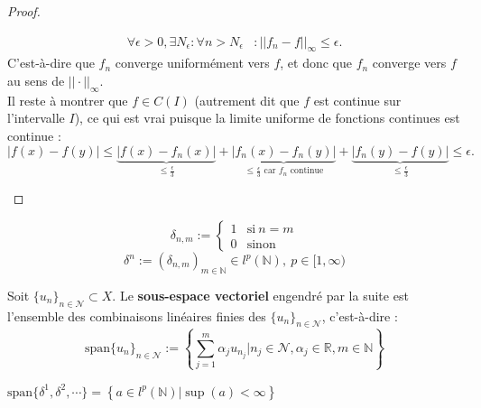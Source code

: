 \begin{proof}
\begin{enumerate}[label=(\roman*)]
\begin{align*}
            \forall\epsilon>0,\exists N_\epsilon:\forall n>N_\epsilon & : ||f_n-f||_\infty\leq\epsilon.
        \end{align*}
        C'est-à-dire que $f_n$ converge uniformément vers $f$, et donc que $f_n$ converge vers $f$ au sens de $||\cdot||_\infty$. \\
        Il reste à montrer que $f\in C(I)$ (autrement dit que $f$ est continue sur l'intervalle $I$), ce qui est vrai puisque la limite uniforme de fonctions continues est continue :
        \begin{equation*}
            |f(x)-f(y)| \leq \underbrace{|f(x)-f_n(x)|}_{\leq \frac{\epsilon}{3}} + \underbrace{|f_n(x)-f_n(y)|}_{\leq \frac{\epsilon}{3} \text{ car $f_n$ continue}} + \underbrace{|f_n(y)-f(y)|}_{\leq \frac{\epsilon}{3}} \leq \epsilon.
        \end{equation*}
    \end{enumerate}
\end{proof}

\begin{definition}
    \begin{equation*}
        \delta_{n,m} := \left\{ \begin{array}{ll}
            1 & \mathrm{si}\ n=m \\
            0 & \mathrm{sinon}
        \end{array} \right.
    \end{equation*}
    \begin{equation*}
        \delta^n := \left( \delta_{n,m} \right)_{m\in\mathbb{N}}\in l^p(\mathbb{N}),\ p\in [1,\infty)
    \end{equation*}
\end{definition}

\begin{definition}
    Soit $\{u_n\}_{n\in\mathcal{N}}\subset X$. Le \textbf{sous-espace vectoriel} engendré par la suite est l'ensemble des combinaisons linéaires finies des $\{u_n\}_{n\in\mathcal{N}}$, c'est-à-dire :
    \begin{equation*}
        \mathrm{span}\{u_n\}_{n\in\mathcal{N}} := \left\{\sum_{j=1}^m \alpha_j u_{n_j} \Big | n_j\in\mathcal{N}, \alpha_j\in\mathbb{R},m\in\mathbb{N} \right\}
    \end{equation*}
\end{definition}

\begin{example}
    $\mathrm{span}\{ \delta^1, \delta^2, \cdots \} = \left\{ a\in l^p(\mathbb{N}) \big | \sup(a)<\infty \right\}$
\end{example}

